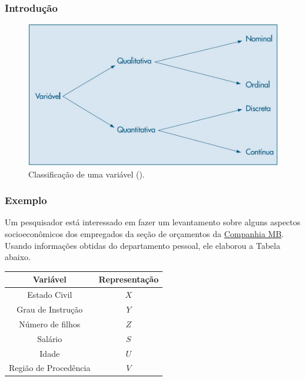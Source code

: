 \documentclass[14pt,aspectratio=1610]{beamer}
\begin{document}
\begin{frame}{}
\frametitle{Introdução}
\begin{block}{}
\justifying
\begin{figure}[H]
    \centering
    \includegraphics[scale=0.5]{Fig2}
    \caption{Classificação de uma variável (\cite{Morettin09}).}
    \label{Fig2_ex}
  \end{figure}
\end{block}
\end{frame}

\begin{frame}{}
\frametitle{Exemplo}
\begin{block}{}
\justifying
Um pesquisador está interessado em fazer um levantamento sobre alguns
aspectos socioeconômicos dos empregados da seção de orçamentos da \href{run:E:/Documentos/GitHub/MAF261/Aulas_MAF105}{Companhia MB}. Usando informações obtidas do departamento pessoal, ele elaborou a Tabela abaixo.
\begin{table}[H]
\label{tab1}
\begin{tabular}{c|c}
\hline
Variável             &Representação\\
\hline
Estado Civil         &$X$\\
Grau de Instrução    &$Y$\\
Número de filhos     &$Z$\\
Salário              &$S$\\
Idade                &$U$\\
Região de Procedência&$V$\\
\hline
\end{tabular}
\end{table}
\end{block}
\end{frame}
\end{document}
